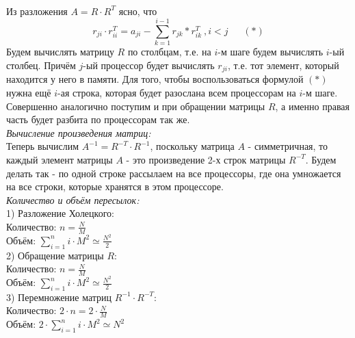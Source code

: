 \documentclass[12pt,a4paper]{article}
\begin{document}
\\
Из разложения $A = R \cdot R^T$ ясно, что
$$r_{j i} \cdot r_{i i}^T = a_{j i} - \sum_{k=1}^{i-1}{r_{j k} * r_{i k}^T} ~, i < j ~ ~ ~ ~ ~ ~ ~ (*) $$
Будем вычислять матрицу $R$ по столбцам, т.е. на $i$-м шаге будем вычислять $i$-ый столбец. Причём $j$-ый процессор будет вычислять $r_{j i}$, т.е. тот элемент, который находится у него в памяти. Для того, чтобы воспользоваться формулой $(*)$ нужна ещё $i$-ая строка, которая будет разослана всем процессорам на $i$-м шаге. Совершенно аналогично поступим и при обращении матрицы $R$, а именно правая часть будет разбита по процессорам так же.
\\
\indent \textit{Вычисление произведения матриц:}
\\
Теперь вычислим $A^{-1} = R^{-T} \cdot R^{-1}$, поскольку матрица $A$ - симметричная, то каждый элемент матрицы $A$ - это произведение 2-х строк матрицы $R^{-T}$. Будем делать так - по одной строке рассылаем на все процессоры, где она умножается на все строки, которые хранятся в этом процессоре.
\\
\indent \textit{Количество и объём пересылок:}
\\
1) Разложение Холецкого:
\\
Количество: $n = \frac{N}{M}$
\\
Объём: $\sum_{i = 1}^{n} {i \cdot M^2} \simeq \frac{N^2}{2} $
\\
2) Обращение матрицы $R$:
\\
Количество: $n = \frac{N}{M}$
\\
Объём: $\sum_{i = 1}^{n} {i \cdot M^2} \simeq \frac{N^2}{2} $
\\
3) Перемножение матриц $R^{-1} \cdot R^{-T}$:
\\
Количество: $2 \cdot n = 2 \cdot \frac{N}{M}$
\\
Объём: $2 \cdot \sum_{i = 1}^{n} {i \cdot M^2} \simeq N^2 $
\end{document}
